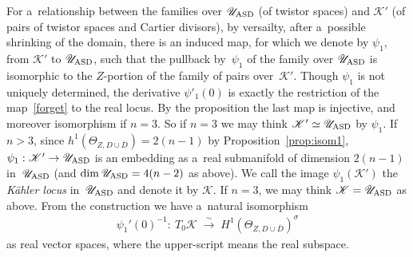 For a~relationship between the families over $\mathscr U_{\rm{ASD}}$ (of twistor spaces) and $\mathscr K'$ (of pairs of
twistor spaces and Cartier divisors), by versailty, after a~possible shrinking of the domain, there is an induced map,
for which we denote by $\psi_1$, from $\mathscr K'$ to $\mathscr U_{\rm{ASD}}$, such that the pullback by~$\psi_1$ of
the family over $\mathscr U_{\rm{ASD}}$ is isomorphic to the $Z$-portion of the family of pairs over~$\mathscr K'$.
Though $\psi_1$ is not uniquely determined, the derivative $\psi'_1(0)$ is exactly the restriction of the
map~\eqref{forget} to the real locus.
By the proposition the last map is injective, and moreover isomorphism if $n=3$.
So if $n=3$ we may think $\mathscr K' \simeq \mathscr U_{\rm{ASD}}$ by $\psi_1$.
If $n>3$, since $h^1(\Theta_{Z,D\cup\overline D}) = 2(n-1)$ by Proposition~\ref{prop:isom1}, $\psi_1:\mathscr
K'\to\mathscr U_{\rm{ASD}}$ is an embedding as a~real submanifold of dimension $2(n-1)$ in~$\mathscr U_{\rm{ASD}}$ (and
$\dim \mathscr U_{\rm{ASD}} = 4(n-2)$ as above).
We call the image $\psi_1(\mathscr K')$ the {\em K\"ahler locus} in~$\mathscr U_{\rm ASD}$ and denote it by $\mathscr
K$.
If $n=3$, we may think $\mathscr K = \mathscr U_{\rm{ASD}}$ as above.
From the construction we have a~natural isomorphism
\begin{gather*}
\psi_1'(0)^{-1}: \ T_0\mathscr K
\;\stackrel{\sim}{\longrightarrow}
\;
H^1(\Theta_{Z,D\cup\overline D})^{\sigma}
\end{gather*}
as real vector spaces, where the upper-script means the real subspace.

